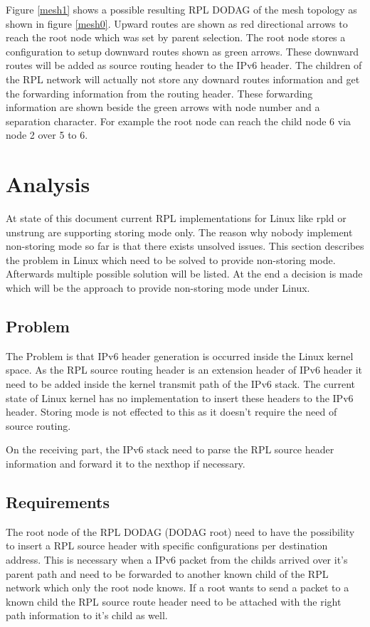 \documentclass[letterpaper]{article}
\begin{document}
Figure \ref{mesh1} shows a possible resulting RPL DODAG of the mesh topology as shown in figure \ref{mesh0}. 
Upward routes are shown as red directional arrows to reach the root node which was set by parent selection.
The root node stores a configuration to setup downward routes shown as green arrows.
These downward routes will be added as source routing header to the IPv6 header.
The children of the RPL network will actually not store any downard routes information and get the forwarding information from the routing header.
These forwarding information are shown beside the green arrows with node number and a separation character.
For example the root node can reach the child node 6 via node 2 over 5 to 6.

\section{Analysis}

At state of this document current RPL implementations for Linux like rpld or unstrung \cite{unstrung} are supporting storing mode only.
The reason why nobody implement non-storing mode so far is that there exists unsolved issues.
This section describes the problem in Linux which need to be solved to provide non-storing mode.
Afterwards multiple possible solution will be listed.
At the end a decision is made which will be the approach to provide non-storing mode under Linux. 

\subsection{Problem}

The Problem is that IPv6 header generation is occurred inside the Linux kernel space.
As the RPL source routing header is an extension header of IPv6 header it need to be added inside the kernel transmit path of the IPv6 stack.
The current state of Linux kernel has no implementation to insert these headers to the IPv6 header.
Storing mode is not effected to this as it doesn't require the need of source routing.

On the receiving part, the IPv6 stack need to parse the RPL source header information and forward it to the nexthop if necessary.

\subsection{Requirements}

The root node of the RPL DODAG (DODAG root) need to have the possibility to insert a RPL source header with specific configurations per destination address.
This is necessary when a IPv6 packet from the childs arrived over it's parent path and need to be forwarded to another known child of the RPL network which only the root node knows.
If a root wants to send a packet to a known child the RPL source route header need to be attached with the right path information to it's child as well.
\end{document}
